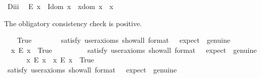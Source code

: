 \begin{isabellebody}
\ D\isactrlsub i\isactrlsub i\isactrlsub i{\isacharcolon}\ %
\ {\isachardoublequoteopen}E\ x\ \isactrlbold {\isasymrightarrow}\ {\isacharparenleft}I{\isacharparenleft}dom\ x{\isacharparenright}\ \isactrlbold {\isasymand}\ x{\isasymcdot}{\isacharparenleft}dom\ x{\isacharparenright}\ {\isasymcong}\ x{\isacharparenright}{\isachardoublequoteclose}%
\begin{isamarkuptext}%
The obligatory consistency check is positive.%
\end{isamarkuptext}\isamarkuptrue%
\ \ \isamarkupfalse%
\ True\ \ %
\isanewline
\ \ \ \ \isamarkupfalse%
\ {\isacharbrackleft}satisfy{\isacharcomma}\ user{\isacharunderscore}axioms{\isacharcomma}\ show{\isacharunderscore}all{\isacharcomma}\ format\ {\isacharequal}\ {}{\isacharcomma}\ expect\ {\isacharequal}\ genuine{\isacharbrackright}%
\isadelimproof
\ %
\endisadelimproof
%
\isatagproof
{}\isamarkupfalse%
%
\endisatagproof
{\isafoldproof}%
%
\isadelimproof
%
\endisadelimproof
\isanewline
\ \ \isamarkupfalse%
\ \ {\isachardoublequoteopen}{\isasymexists}x{\isachardot}\ \isactrlbold {\isasymnot}{\isacharparenleft}E\ x{\isacharparenright}{\isachardoublequoteclose}\ \ True\ \ %
\ \isanewline
\ \ \ \ \isamarkupfalse%
\ {\isacharbrackleft}satisfy{\isacharcomma}\ user{\isacharunderscore}axioms{\isacharcomma}\ show{\isacharunderscore}all{\isacharcomma}\ format\ {\isacharequal}\ {}{\isacharcomma}\ expect\ {\isacharequal}\ genuine{\isacharbrackright}%
\isadelimproof
\ %
\endisadelimproof
%
\isatagproof
{}\isamarkupfalse%
%
\endisatagproof
{\isafoldproof}%
%
\isadelimproof
%
\endisadelimproof
\isanewline
\ \ \isamarkupfalse%
\ \ {\isachardoublequoteopen}{\isacharparenleft}{\isasymexists}x{\isachardot}\ \isactrlbold {\isasymnot}{\isacharparenleft}E\ x{\isacharparenright}{\isacharparenright}\ {\isasymand}\ {\isacharparenleft}{\isasymexists}x{\isachardot}\ {\isacharparenleft}E\ x{\isacharparenright}{\isacharparenright}{\isachardoublequoteclose}\ \ True\ \ %
\ \isanewline
\ \ \ \ \isamarkupfalse%
\ {\isacharbrackleft}satisfy{\isacharcomma}\ user{\isacharunderscore}axioms{\isacharcomma}\ show{\isacharunderscore}all{\isacharcomma}\ format\ {\isacharequal}\ {}{\isacharcomma}\ expect\ {\isacharequal}\ genuine{\isacharbrackright}%

\end{isabellebody}
